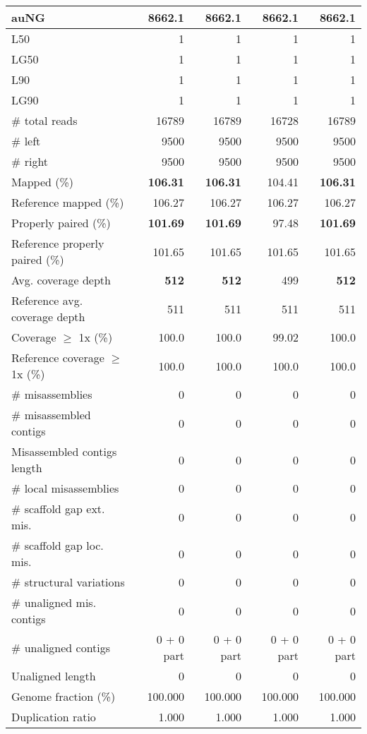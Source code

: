 \documentclass[12pt,a4paper]{article}
\begin{document}
\begin{table}[ht]
\begin{center}
\begin{tabular}{|l*{4}{|r}|}
auNG & 8662.1 & 8662.1 & 8662.1 & 8662.1 \\ \hline
L50 & 1 & 1 & 1 & 1 \\ \hline
LG50 & 1 & 1 & 1 & 1 \\ \hline
L90 & 1 & 1 & 1 & 1 \\ \hline
LG90 & 1 & 1 & 1 & 1 \\ \hline
\# total reads & 16789 & 16789 & 16728 & 16789 \\ \hline
\# left & 9500 & 9500 & 9500 & 9500 \\ \hline
\# right & 9500 & 9500 & 9500 & 9500 \\ \hline
Mapped (\%) & {\bf 106.31} & {\bf 106.31} & 104.41 & {\bf 106.31} \\ \hline
Reference mapped (\%) & 106.27 & 106.27 & 106.27 & 106.27 \\ \hline
Properly paired (\%) & {\bf 101.69} & {\bf 101.69} & 97.48 & {\bf 101.69} \\ \hline
Reference properly paired (\%) & 101.65 & 101.65 & 101.65 & 101.65 \\ \hline
Avg. coverage depth & {\bf 512} & {\bf 512} & 499 & {\bf 512} \\ \hline
Reference avg. coverage depth & 511 & 511 & 511 & 511 \\ \hline
Coverage $\geq$ 1x (\%) & 100.0 & 100.0 & 99.02 & 100.0 \\ \hline
Reference coverage $\geq$ 1x (\%) & 100.0 & 100.0 & 100.0 & 100.0 \\ \hline
\# misassemblies & 0 & 0 & 0 & 0 \\ \hline
\# misassembled contigs & 0 & 0 & 0 & 0 \\ \hline
Misassembled contigs length & 0 & 0 & 0 & 0 \\ \hline
\# local misassemblies & 0 & 0 & 0 & 0 \\ \hline
\# scaffold gap ext. mis. & 0 & 0 & 0 & 0 \\ \hline
\# scaffold gap loc. mis. & 0 & 0 & 0 & 0 \\ \hline
\# structural variations & 0 & 0 & 0 & 0 \\ \hline
\# unaligned mis. contigs & 0 & 0 & 0 & 0 \\ \hline
\# unaligned contigs & 0 + 0 part & 0 + 0 part & 0 + 0 part & 0 + 0 part \\ \hline
Unaligned length & 0 & 0 & 0 & 0 \\ \hline
Genome fraction (\%) & 100.000 & 100.000 & 100.000 & 100.000 \\ \hline
Duplication ratio & 1.000 & 1.000 & 1.000 & 1.000 \\ \hline

\end{tabular}
\end{center}
\end{table}
\end{document}
